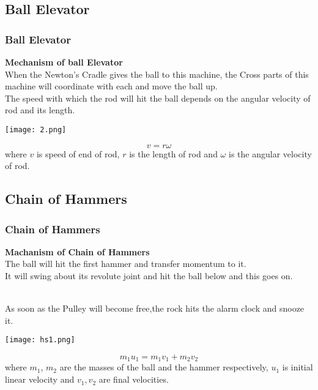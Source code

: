 \documentclass{beamer}
\begin{document}
\subsection{Ball Elevator}
\begin{frame}
\frametitle{Ball Elevator}
{\bf Mechanism of ball Elevator}
\\
\pause
When the Newton's Cradle gives the ball to this machine, the Cross parts of this machine will coordinate with each and move the ball up.
\pause
\\The speed with which the rod will hit the ball depends on the angular velocity of rod and its length.
\pause
\\
\begin{minipage}{0.4\linewidth}
\hspace{1cm} \texttt{[image: 2.png]}
\end{minipage}%
\begin{minipage}{0.6\linewidth}
\begin{equation} v=r\omega \end{equation}
where $v$ is speed of end of rod, $r$ is the length of rod and $\omega$ is the angular velocity of rod.
\end{minipage}
\end{frame}


\subsection{Chain of Hammers}
\begin{frame}
\frametitle{Chain of Hammers}
{\bf Machanism of Chain of Hammers\cite{ref_2}}
\\\pause The ball will hit the first hammer and transfer momentum to it.
\\\pause It will swing about its revolute joint and hit the ball below and this goes on.

\pause\\
As soon as the Pulley will become free,the rock hits the alarm clock and  snooze it.
\pause\\ 
\begin{minipage}{0.4\linewidth}
\hspace{1cm}\texttt{[image: hs1.png]}
\end{minipage}
\begin{minipage}{0.5\linewidth}
\begin{equation} m_1u_1=m_1v_1+m_2v_2\end{equation}
where $m_1$, $m_2$ are the masses of the ball and the hammer respectively, $u_1$ is initial linear velocity and $v_1,v_2$ are final velocities.
\end{minipage}
\end{frame}
\end{document}
